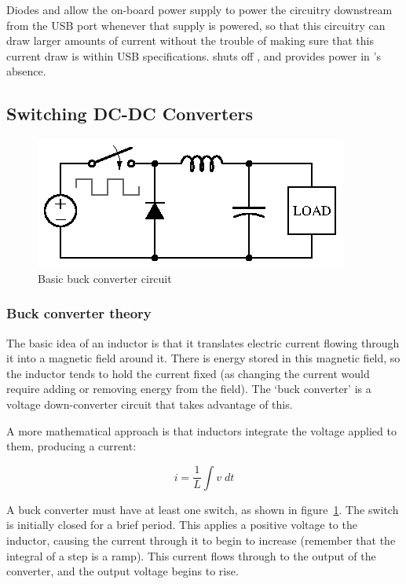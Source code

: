 Diodes  and  allow the on-board power supply to power
the circuitry downstream from the USB port whenever that supply is powered,
so that this circuitry can draw larger amounts of current without the trouble
of making sure that this current draw is within USB specifications.
 shuts off , and  provides power in
's absence.


\subsection{Switching DC-DC Converters}


\begin{figure}[H]
\centering
\includegraphics[]{buckconv}
\caption{Basic buck converter circuit}
\label{fig:basicbuck}
\end{figure}

\subsubsection{Buck converter theory}

The basic idea of an inductor is that it translates electric current flowing
through it into a magnetic field around it. There is energy stored in this
magnetic field, so the inductor tends to hold the current fixed (as changing
the current would require adding or removing energy from the field). The
`buck converter' is a voltage down-converter circuit that takes advantage
of this.

A more mathematical approach is that inductors integrate the voltage applied
to them, producing a current:

\begin{equation*}
    i = \frac{1}{L} \int v\;dt
\end{equation*}

A buck converter must have at least one switch, as shown in
figure~\ref{fig:basicbuck}.  The switch is initially closed for a brief period.
This applies a positive voltage to the inductor, causing the current through it
to begin to increase (remember that the integral of a step is a ramp). This
current flows through to the output of the converter, and the output voltage
begins to rise.

